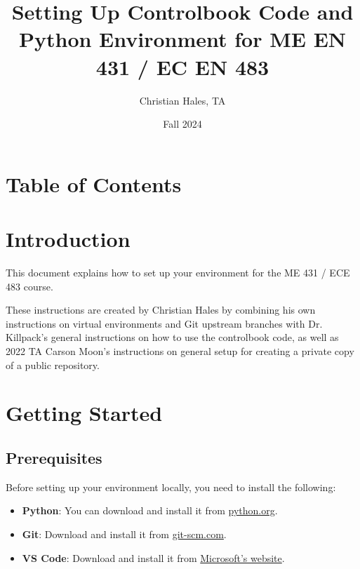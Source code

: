 \documentclass{article}
\title{Setting Up Controlbook Code and Python Environment for ME EN 431 / EC EN 483}
\author{Christian Hales, TA}
\date{Fall 2024}
\begin{document}
\maketitle
\section*{Table of Contents}
\label{toc}
\tableofcontents

\newpage

\section{Introduction}

This document explains how to set up your environment for the ME 431 / ECE 483 course.

These instructions are created by Christian Hales by combining his own instructions on virtual environments and Git upstream branches with Dr. Killpack's general instructions on how to use the controlbook code, as well as 2022 TA Carson Moon's instructions on general setup for creating a private copy of a public repository.

\section{Getting Started}

\subsection{Prerequisites}
Before setting up your environment locally, you need to install the following:

\begin{itemize}
    \item \textbf{Python}: You can download and install it from \href{https://www.python.org/downloads/}{python.org}.
    \item \textbf{Git}: Download and install it from \href{https://git-scm.com/downloads}{git-scm.com}.
    \item \textbf{VS Code}: Download and install it from \href{https://visualstudio.microsoft.com/downloads/}{Microsoft's website}.
\end{itemize}
\end{document}
